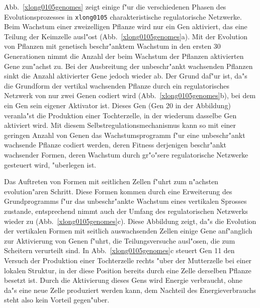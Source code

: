\begin{sloppypar}
Abb.\ \ref{xlong0105genomes} zeigt einige f"ur die verschiedenen Phasen des Evolutionsprozesses
in \verb|xlong0105| charakteristische regulatorische Netzwerke. Beim Wachstum einer zweizelligen
Pflanze wird nur ein Gen aktiviert, das eine Teilung der Keimzelle ausl"ost
(Abb.\ \ref{xlong0105genomes}a). Mit der Evolution von 
Pflanzen mit genetisch beschr"anktem Wachstum in den ersten 30 Generationen nimmt die Anzahl der
beim Wachstum der Pflanzen aktivierten Gene zun"achst zu. Bei der Ausbreitung der unbeschr"ankt
wachsenden Pflanzen sinkt die Anzahl aktivierter Gene jedoch wieder ab. Der Grund daf"ur ist,
da"s die Grundform der vertikal wachsenden Pflanze durch ein regulatorisches Netzwerk von nur
zwei Genen codiert wird (Abb.\ \ref{xlong0105genomes}b), bei dem ein Gen
sein eigener Aktivator ist. Dieses Gen (Gen 20 in der Abbildung) veranla"st die Produktion einer
Tochterzelle, in der wiederum dasselbe Gen aktiviert wird. Mit diesem Selbstregulationsmechanismus
kann so mit einer geringen Anzahl von Genen das Wachstumsprogramm f"ur eine unbeschr"ankt wachsende
Pflanze codiert werden, deren Fitness derjenigen beschr"ankt wachsender Formen, deren Wachstum durch gr"o"sere
regulatorische Netzwerke gesteuert wird, "uberlegen ist.
\end{sloppypar}

Das Auftreten von Formen mit seitlichen Zellen f"uhrt zum n"achsten evolution"aren Schritt. Diese
Formen kommen durch eine Erweiterung des Grundprogramms f"ur das unbeschr"ankte Wachstum eines vertikalen
Sprosses zustande, entsprechend nimmt auch der Umfang des regulatorischen Netzwerks wieder zu
(Abb.\ \ref{xlong0105genomes}c). Diese Abbildung zeigt, da"s die Evolution der vertikalen
Formen mit seitlich auswachsenden Zellen einige Gene anf"anglich zur Aktivierung von Genen f"uhrt,
die Teilungsversuche ausl"osen, die zum Scheitern verurteilt sind. In Abb.\ \ref{xlong0105genomes}c
steuert Gen 11 den Versuch der Produktion einer Tochterzelle rechts "uber der Mutterzelle bei einer
lokalen Struktur, in der diese Position bereits durch eine Zelle derselben Pflanze besetzt ist.
Durch die Aktivierung dieses Gens wird Energie verbraucht, ohne da"s eine neue Zelle produziert werden
kann, dem Nachteil des Energieverbrauchs steht also kein Vorteil gegen"uber.

